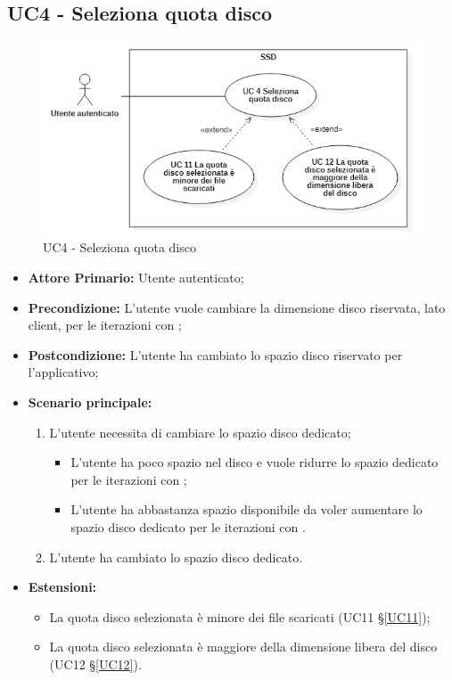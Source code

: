 \subsection{UC4 - Seleziona quota disco}
\label{UC4}
\begin{figure}[H]
    \centering
    \includegraphics[scale = 0.7]{components/img/UC4.png}
    \caption{UC4 - Seleziona quota disco}
\end{figure}
\begin{itemize}
\item \textbf{Attore Primario:} Utente autenticato;
\item \textbf{Precondizione:} L'utente vuole cambiare la dimensione disco riservata, lato client, per le iterazioni con ;
\item \textbf{Postcondizione:} L'utente ha cambiato lo spazio disco riservato per l'applicativo;
\item \textbf{Scenario principale:}
    \begin{enumerate}
    \item L'utente necessita di cambiare lo spazio disco dedicato;
        \begin{itemize}
        \item L'utente ha poco spazio nel disco e vuole ridurre lo spazio dedicato per le iterazioni con ;
        \item L'utente ha abbastanza spazio disponibile da voler aumentare lo spazio disco dedicato per le iterazioni con .
        \end{itemize}
    \item L'utente ha cambiato lo spazio disco dedicato.
    \end{enumerate}
\item \textbf{Estensioni:}
    \begin{itemize}
        \item La quota disco selezionata è minore dei file scaricati (UC11 \S{}\ref{UC11});
        \item La quota disco selezionata è maggiore della dimensione libera del disco (UC12 \S{}\ref{UC12}).
    \end{itemize}
\end{itemize}